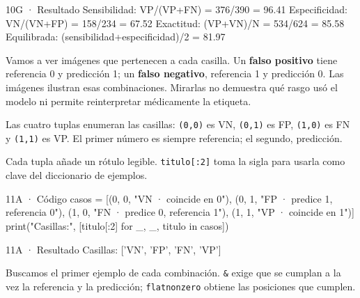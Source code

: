 \begin{Salida}{10G · Resultado}
Sensibilidad: VP/(VP+FN) = 376/390 = 96.41%
Especificidad: VN/(VN+FP) = 158/234 = 67.52%
Exactitud: (VP+VN)/N = 534/624 = 85.58%
Equilibrada: (sensibilidad+especificidad)/2 = 81.97%
\end{Salida}

\label{bloque-11}

Vamos a ver imágenes que pertenecen a cada casilla. Un \textbf{falso positivo} tiene referencia 0 y predicción 1; un \textbf{falso negativo}, referencia 1 y predicción 0. Las imágenes ilustran esas combinaciones. Mirarlas no demuestra qué rasgo usó el modelo ni permite reinterpretar médicamente la etiqueta.


\label{paso-11a}

Las cuatro tuplas enumeran las casillas: \texttt{\small (\allowbreak{}0,\allowbreak{}0)\allowbreak{}} es VN, \texttt{\small (\allowbreak{}0,\allowbreak{}1)\allowbreak{}} es FP, \texttt{\small (\allowbreak{}1,\allowbreak{}0)\allowbreak{}} es FN y \texttt{\small (\allowbreak{}1,\allowbreak{}1)\allowbreak{}} es VP. El primer número es siempre referencia; el segundo, predicción.

Cada tupla añade un rótulo legible. \texttt{\small titulo[\allowbreak{}:\allowbreak{}2]\allowbreak{}} toma la sigla para usarla como clave del diccionario de ejemplos.


\begin{Codigo}{11A · Código}
casos = [(0, 0, "VN · coincide en 0"), (0, 1, "FP · predice 1, referencia 0"), (1, 0, "FN · predice 0, referencia 1"), (1, 1, "VP · coincide en 1")]
print("Casillas:", [titulo[:2] for _, _, titulo in casos])
\end{Codigo}

\begin{Salida}{11A · Resultado}
Casillas: ['VN', 'FP', 'FN', 'VP']
\end{Salida}

\label{paso-11b}

Buscamos el primer ejemplo de cada combinación. \texttt{\small \&} exige que se cumplan a la vez la referencia y la predicción; \texttt{\small flatnonzero} obtiene las posiciones que cumplen.

